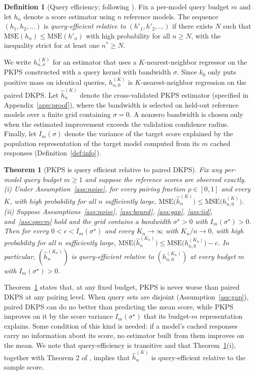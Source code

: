 \documentclass{article}
\newtheorem{theorem}{Theorem}
\theoremstyle{definition}
\newtheorem{definition}{Definition}
\theoremstyle{plain}
\newcommand{\PKPS}{PKPS\xspace}
\begin{document}
\begin{definition}[Query efficiency; following \citealp{dkps_qeff}]
\label{def:qeff}
Fix a per-model query budget $m$ and let $h_n$ denote a score estimator using $n$
reference models. The sequence $(h_{1}, h_{2}, \hdots)$ is \emph{query-efficient
relative to} $(h'_{1}, h'_{2}, \hdots)$ if there exists $N$ such that
$\mathrm{MSE}(h_n)\le\mathrm{MSE}(h'_n)$ with high probability for all $n\ge N$,
with the inequality strict for at least one $n^{*}\ge N$.
\end{definition}
We write $h_{n,\sigma}^{(K)}$ for an estimator that uses a $K$-nearest-neighbor
regressor on the \PKPS constructed with a query kernel with bandwidth $\sigma$.
Since $k_{0}$ only puts positive mass on identical queries, $h_{n,0}^{(K)}$ is
$K$-nearest-neighbor regression on the paired DKPS.
Let $\hat h_{n}^{(K)}$ denote the cross-validated \PKPS estimator (specified in
Appendix~\ref{app:proof}), where the
bandwidth is selected on held-out reference models over a finite grid containing
$\sigma=0$.
A nonzero bandwidth is chosen only when the estimated improvement
exceeds the validation confidence radius.
Finally, let $I_{m}(\sigma)$ denote the variance of the target score explained by the
population representation of the target model computed from its $m$ cached responses
(Definition~\ref{def:info}).
\begin{theorem}[\PKPS is query efficient relative to paired DKPS]
\label{thm:qeff}
Fix any per-model query budget $m\ge1$ and suppose the reference scores are observed
exactly.
(i) Under Assumption~\ref{ass:noise}, for every pairing fraction $\rho\in[0,1]$ and
every $K$, with high probability for all $n$ sufficiently large,
$\mathrm{MSE}\big(\hat h_{n}^{(K)}\big)\le\mathrm{MSE}\big(h_{n,0}^{(K)}\big)$.
(ii) Suppose Assumptions~\ref{ass:noise}, \ref{ass:bound}, \ref{ass:gap},
\ref{ass:iid}, and~\ref{ass:specm} hold and the grid contains a bandwidth
$\sigma^{\star}>0$ with $I_{m}(\sigma^{\star})>0$. Then for every
$0<c<I_{m}(\sigma^{\star})$ and every $K_{n}\to\infty$ with $K_{n}/n\to0$, with high
probability for all $n$ sufficiently large,
$\mathrm{MSE}\big(\hat h_{n}^{(K_{n})}\big)\le\mathrm{MSE}\big(h_{n,0}^{(K_{n})}\big)-c$.
In particular, $(\hat h_{n}^{(K_{n})})$ is query-efficient relative to
$(h_{n,0}^{(K_{n})})$ at every budget $m$ with $I_{m}(\sigma^{\star})>0$.
\end{theorem}
Theorem~\ref{thm:qeff} states that, at any fixed budget, \PKPS is never worse than
paired DKPS at any pairing level. When query sets are disjoint
(Assumption~\ref{ass:gap}), paired DKPS can do no better than predicting the mean
score, while \PKPS improves on it by the score variance $I_{m}(\sigma^{\star})$ that
its budget-$m$ representation explains. Some condition of this kind is needed: if a
model's cached responses carry no information about its score, no estimator built
from them improves on the mean.
We note that query-efficiency is transitive and that Theorem~\ref{thm:qeff}(i),
together with Theorem 2 of \citet{dkps_qeff}, implies that $\hat h_{n}^{(K)}$ is
query-efficient relative to the sample score.
\end{document}
